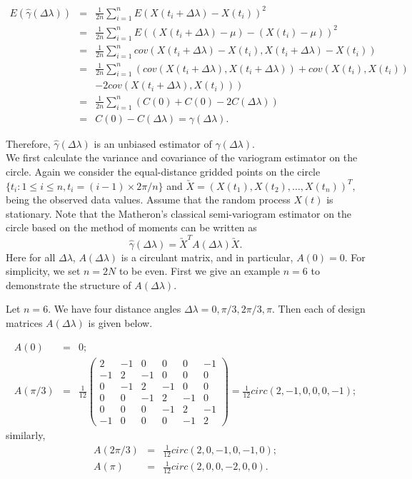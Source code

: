 \begin{eqnarray*}
E(\hat{\gamma}(\Delta \lambda)) &=& \frac{1}{2n} \sum_{i = 1}^n E(X(t_i + \Delta \lambda) - X(t_i))^2 \\
&=& \frac{1}{2n} \sum_{i = 1}^n E((X(t_i + \Delta \lambda)-\mu) - (X(t_i) - \mu))^2 \\
&=& \frac{1}{2n} \sum_{i = 1}^n cov(X(t_i + \Delta \lambda) - X(t_i), X(t_i + \Delta \lambda) - X(t_i)) \\
&=& \frac{1}{2n} \sum_{i = 1}^n \left(cov(X(t_i + \Delta \lambda), X(t_i + \Delta \lambda)) + cov(X(t_i), X(t_i))\right. \\
& & - \left. 2cov(X(t_i + \Delta \lambda), X(t_i)) \right)\\
&=& \frac{1}{2n} \sum_{i = 1}^n \left( C(0) + C(0) - 2C(\Delta \lambda)\right) \\
&=& C(0) - C(\Delta \lambda) = \gamma(\Delta \lambda).
\end{eqnarray*}

\noi Therefore, $\hat{\gamma}(\Delta \lambda)$ is an unbiased estimator of $\gamma(\Delta \lambda)$. \\

We first calculate the variance and covariance of the variogram estimator on the circle. Again we consider the equal-distance gridded points on the circle $\{t_i: 1 \le i \le n, t_i = (i-1) \times 2\pi/n\}$ and $\utilde{X} = (X(t_1), X(t_2), \ldots, X(t_n))^T,$ being the observed data values. Assume that the random process $X(t)$ is stationary. Note that the Matheron's classical semi-variogram estimator on the circle based on the method of moments can be written as
\[
\hat{\gamma}(\Delta \lambda) = \utilde{X}^T A(\Delta \lambda)\utilde{X}.
\]
Here for all $\Delta \lambda$, $A(\Delta \lambda)$ is a circulant matrix, and in particular, $A(0)= 0$. For simplicity, we set $n = 2N$ to be even. First we give an example $n = 6$ to demonstrate the structure of $A(\Delta \lambda)$.

Let $n = 6$. We have four distance angles $\Delta \lambda = 0, \pi/3, 2\pi/3, \pi$. Then each of design matrices $A(\Delta \lambda)$ is given below.

\begin{eqnarray*}
A(0) &=& 0 ;  \\
A(\pi/3) &=& \frac{1}{12} \left(\begin{array}{cccccc}
2  &  -1 & 0  & 0 & 0 & -1 \\
-1 &  2  & -1 & 0 & 0 & 0   \\
0  & -1  & 2  & -1 & 0  & 0 \\
0  & 0   & -1 & 2  & -1 & 0 \\
0  & 0   &  0 & -1 & 2  & -1 \\
-1 & 0   &  0 &  0 & -1 & 2
\end{array}
\right) = \frac{1}{12} circ(2, -1, 0, 0, 0, -1);
\end{eqnarray*}
similarly,
\begin{eqnarray*}
A(2\pi/3) &=&  \frac{1}{12} circ(2, 0, -1, 0, -1, 0);\\
A(\pi) &=& \frac{1}{12} circ(2, 0, 0, -2, 0, 0).
\end{eqnarray*}

